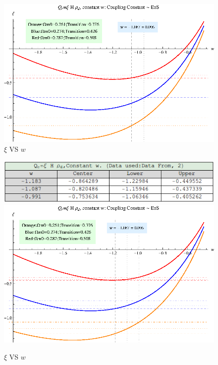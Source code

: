 \documentclass[12pt,a4paper]{article}
\begin{document}
\begin{figure}
\centering
\includegraphics[width=500pt]{rhod_I2CC_xiVSw.eps}
\caption{$\xi$ VS $w$}\label{fig-rhod_I2CC_xiVSw}
\end{figure}

\begin{figure}
\centering
\includegraphics[width=450pt]{rhod_I2CC_table1.png}
\includegraphics[width=500pt]{rhod_I2CC_xiVSw2.eps}
\caption{$\xi$ VS $w$}\label{fig-rhod_I2CC_xiVSw2}
\end{figure}
\end{document}
